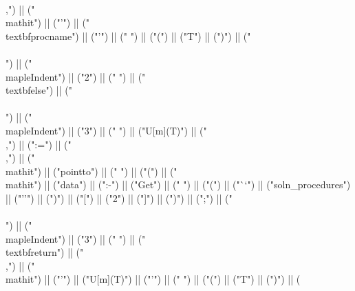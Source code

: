 \documentclass{article}
\begin{document}
\begin{center}
\begin{maplelatex}
{\\,") || ("\\mathit{") || ("'") || ("\\textbf{procname}") || ("'") || ("} ") || ("(") || ("T") || (")") || ("\\\\\n") || ("\\mapleIndent{") || ("2") || ("} ") || ("\\textbf{else}") || ("\\\\\n") || ("\\mapleIndent{") || ("3") || ("} ") || ("U[m](T)") || ("\\,") || (":=") || ("\\,") || ("\\mathit{") || ("pointto") || ("} ") || ("(") || ("\\mathit{") || ("data") || (":-") || ("Get") || ("} ") || ("(") || ("``") || ("soln_procedures") || ("''") || (")") || ("[") || ("2") || ("]") || (")") || (";") || ("\\\\\n") || ("\\mapleIndent{") || ("3") || ("} ") || ("\\textbf{return}") || ("\\,") || ("\\mathit{") || ("'") || ("U[m](T)") || ("'") || ("} ") || ("(") || ("T") || (")") || (}
\end{maplelatex}
\end{center}
\end{document}
